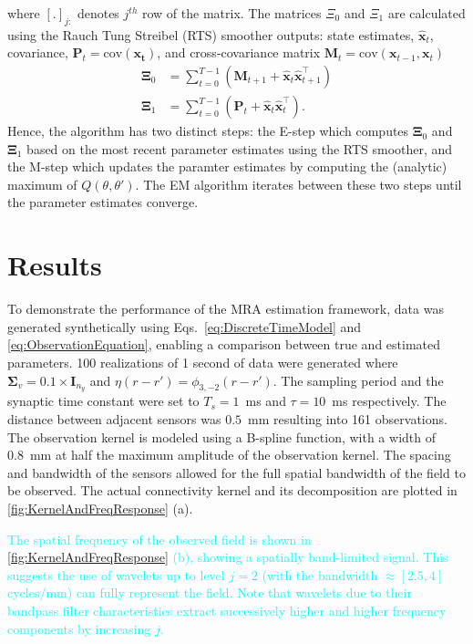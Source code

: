 \documentclass[journal,a4paper]{IEEEtran}
\newcommand{\cut}[1]{\textcolor{cyan}{#1}}
\begin{document}
where $[.]_{j:} $ denotes $j^{th}$ row of the matrix.%
 The matrices $\Xi_0$ and $\Xi_1$ are calculated using the Rauch Tung Streibel (RTS)\cite{RAUCH1965} smoother outputs: state estimates, $\hat{\mathbf x}_t$, covariance, $\mathbf P_t=\mathrm{cov}(\mathbf{x_t})$, and cross-covariance matrix $\mathbf M_t=\mathrm{cov}(\mathbf{x}_{t-1},\mathbf{x}_{t})$ 
\begin{align}\label{eq:Xivariables}
\boldsymbol\Xi_0&=\sum_{t=0}^{T-1}\left(\mathbf M_{t+1}+\mathbf{\hat x}_t\mathbf{\hat x}_{t+1}^\top\right) \\
 \boldsymbol\Xi_1&=\sum_{t=0}^{T-1}\left(\mathbf P_t+\mathbf{\hat x}_t\mathbf{\hat x}_t^\top\right).
\end{align}
Hence, the algorithm has two distinct steps: the E-step which computes $\boldsymbol\Xi_0$ and $\boldsymbol\Xi_1$ based on the most recent parameter estimates using the RTS smoother, and the M-step which updates the paramter estimates by computing the (analytic) maximum of $Q(\theta,\theta')$. The EM algorithm iterates between these two steps until the parameter estimates converge. 


\section{Results}
To demonstrate the performance of the MRA estimation framework, data was generated synthetically  using Eqs.~\ref{eq:DiscreteTimeModel} and \ref{eq:ObservationEquation}, enabling a comparison between true and estimated parameters. 100 realizations of 1 second of data were generated where $\boldsymbol\Sigma_v=0.1 \times \mathbf{I}_{n_y}$ and $\eta(r-r')=\phi_{3,-2}(r-r')$. The sampling period and the synaptic time constant were set to $T_s = 1$~ms and $\tau = 10$~ms respectively. The distance between adjacent sensors was $0.5$~mm resulting into 161 observations. The observation kernel is modeled using a B-spline function, with a width of 0.8~mm at half the maximum amplitude of the observation kernel. The spacing and bandwidth of the sensors allowed for the full spatial bandwidth of the field to be observed. The actual connectivity kernel and its decomposition are plotted in \figurename{\ref{fig:KernelAndFreqResponse}} (a). 

\cut{The spatial frequency of the observed field is shown in \figurename{\ref{fig:KernelAndFreqResponse}} (b), showing a spatially band-limited signal. This suggests the use of wavelets up to level $j=2$ (with the bandwidth $\approx[2.5,4]$ cycles/mm) can fully represent the field. Note that wavelets due to their bandpass filter characteristics extract successively higher and higher frequency components by increasing $j$.}
\end{document}
